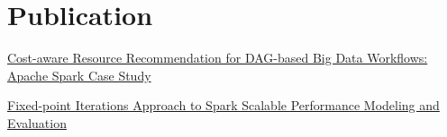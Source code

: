 \documentclass[letterpaper]{deedy-resume} %
\begin{document}
\begin{minipage}[t]{0.66\textwidth}
\sectionspace %



\section{Publication}

\href{https://ieeexplore.ieee.org/document/9894699}{Cost-aware Resource Recommendation for DAG-based Big Data Workflows: Apache Spark Case Study}

\sectionspace %

\href{https://ieeexplore.ieee.org/document/9573291}{Fixed-point Iterations Approach to Spark Scalable Performance Modeling and Evaluation}

\sectionspace %


%
%


\end{minipage}
\end{document}
